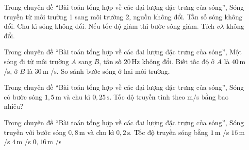 \begin{ex}
Trong chuyên đề “Bài toán tổng hợp về các đại lượng đặc trưng của sóng”, Sóng truyền từ môi trường 1 sang môi trường 2, nguồn không đổi.
\choiceTF
{\True Tần số sóng không đổi.}
{\True Chu kì sóng không đổi.}
{\True Nếu tốc độ giảm thì bước sóng giảm.}
{Tích $v\lambda$ không đổi.}
\end{ex}

\begin{ex}
Trong chuyên đề “Bài toán tổng hợp về các đại lượng đặc trưng của sóng”, Một sóng đi từ môi trường $A$ sang $B$, tần số $20\,\text{Hz}$ không đổi. Biết tốc độ ở $A$ là $40\,\text{m}$ /s, ở $B$ là $30\,\text{m}$ /s. So sánh bước sóng ở hai môi trường.
\choiceTF

\end{ex}

\begin{ex}
Trong chuyên đề “Bài toán tổng hợp về các đại lượng đặc trưng của sóng”, Sóng có bước sóng $1,5\,\text{m}$ và chu kì $0,25\,\text{s}$. Tốc độ truyền tính theo m/s bằng bao nhiêu?
\end{ex}

\begin{ex}
Trong chuyên đề “Bài toán tổng hợp về các đại lượng đặc trưng của sóng”, Sóng truyền với bước sóng $0,8\,\text{m}$ và chu kì $0,2\,\text{s}$. Tốc độ truyền sóng bằng
\choice
{$1\,\text{m}$ /s}
{$16\,\text{m}$ /s}
{\True $4\,\text{m}$ /s}
{$0,16\,\text{m}$ /s}
\end{ex}

